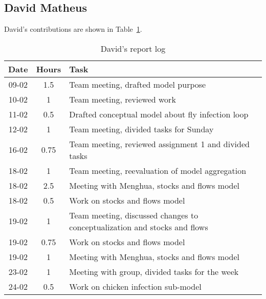 
\subsection{David Matheus}
David's contributions are shown in Table~\ref{tab:david_log}. 
\begin{longtable}[c]{c|c|m{35em}}
\caption{David's report log}
\label{tab:david_log}\\
\textbf{Date}& \textbf{Hours} & \textbf{Task} \\
\hline
\endfirsthead
%
\endhead
%
09-02   &   1.5     &   Team meeting, drafted model purpose                                         \\
10-02   &   1       &   Team meeting, reviewed work                                                 \\
11-02   &   0.5     &   Drafted conceptual model about fly infection loop                           \\
12-02   &   1       &   Team meeting, divided tasks for Sunday                                      \\
16-02   &   0.75    &   Team meeting, reviewed assignment 1 and divided tasks                       \\
18-02   &   1       &   Team meeting, reevaluation of model aggregation                             \\
18-02   &   2.5     &   Meeting with Menghua, stocks and flows model                                \\
18-02   &   0.5     &   Work on stocks and flows model                                              \\
19-02   &   1       &   Team meeting, discussed changes to conceptualization and stocks and flows   \\
19-02   &   0.75    &   Work on stocks and flows model                                              \\
19-02   &   1       &   Meeting with Menghua, stocks and flows model                                \\
23-02   &   1       &   Meeting with group, divided tasks for the week                              \\
24-02   &   0.5     &   Work on chicken infection sub-model                                         \\

\end{longtable}
